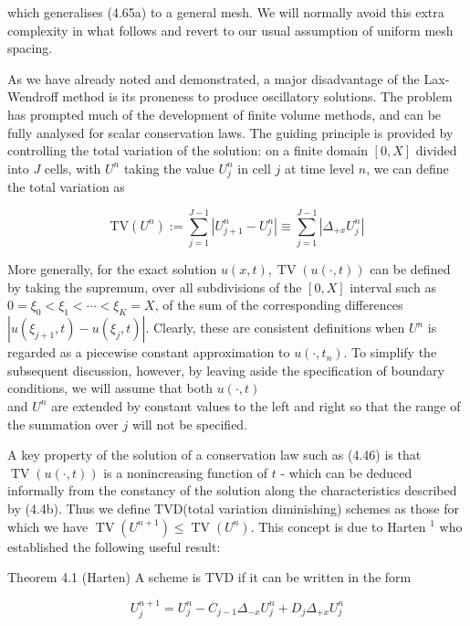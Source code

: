 \documentclass[10pt]{article}
\begin{document}
which generalises (4.65a) to a general mesh. We will normally avoid this extra complexity in what follows and revert to our usual assumption of uniform mesh spacing.

As we have already noted and demonstrated, a major disadvantage of the Lax-Wendroff method is its proneness to produce oscillatory solutions. The problem has prompted much of the development of finite volume methods, and can be fully analysed for scalar conservation laws. The guiding principle is provided by controlling the total variation of the solution: on a finite domain \([0, X]\) divided into \(J\) cells, with \(U^{n}\) taking the value \(U_{j}^{n}\) in cell \(j\) at time level \(n\), we can define the total variation as

\[
\mathrm{TV}\left(U^{n}\right):=\sum_{j=1}^{J-1}\left|U_{j+1}^{n}-U_{j}^{n}\right| \equiv \sum_{j=1}^{J-1}\left|\Delta_{+x} U_{j}^{n}\right|
\]

More generally, for the exact solution \(u(x, t), \operatorname{TV}(u(\cdot, t))\) can be defined by taking the supremum, over all subdivisions of the \([0, X]\) interval such as \(0=\xi_{0}<\xi_{1}<\cdots<\xi_{K}=X\), of the sum of the corresponding differences \(\left|u\left(\xi_{j+1}, t\right)-u\left(\xi_{j}, t\right)\right|\). Clearly, these are consistent definitions when \(U^{n}\) is regarded as a piecewise constant approximation to \(u\left(\cdot, t_{n}\right)\). To simplify the subsequent discussion, however, by leaving aside the specification of boundary conditions, we will assume that both \(u(\cdot, t)\)\\
and \(U^{n}\) are extended by constant values to the left and right so that the range of the summation over \(j\) will not be specified.

A key property of the solution of a conservation law such as (4.46) is that \(\operatorname{TV}(u(\cdot, t))\) is a nonincreasing function of \(t\) - which can be deduced informally from the constancy of the solution along the characteristics described by (4.4b). Thus we define TVD(total variation diminishing) schemes as those for which we have \(\operatorname{TV}\left(U^{n+1}\right) \leq \operatorname{TV}\left(U^{n}\right)\). This concept is due to Harten \({ }^{1}\) who established the following useful result:

Theorem 4.1 (Harten) A scheme is TVD if it can be written in the form

\[
U_{j}^{n+1}=U_{j}^{n}-C_{j-1} \Delta_{-x} U_{j}^{n}+D_{j} \Delta_{+x} U_{j}^{n}
\]
\end{document}
